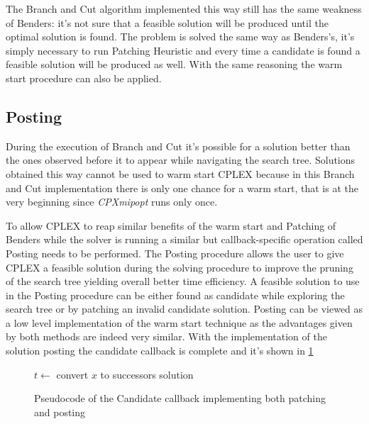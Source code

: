 The Branch and Cut algorithm implemented this way still has the same weakness of Benders: it's not sure that a feasible solution will be produced until the optimal solution is found.
The problem is solved the same way as Benders's, it's simply necessary to run Patching Heuristic and every time a candidate is found a feasible solution will be produced as well.
With the same reasoning the warm start procedure can also be applied.

\subsection{Posting}
During the execution of Branch and Cut it's possible for a solution better than the ones observed before it to appear while navigating the search tree.
Solutions obtained this way cannot be used to warm start CPLEX because in this Branch and Cut implementation there is only one chance for a warm start, that is at the very beginning since \textit{CPXmipopt} runs only once.

To allow CPLEX to reap similar benefits of the warm start and Patching of Benders while the solver is running a similar but callback-specific operation called Posting needs to be performed.
The Posting procedure allows the user to give CPLEX a feasible solution during the solving procedure to improve the pruning of the search tree yielding overall better time efficiency.
A feasible solution to use in the Posting procedure can be either found as candidate while exploring the search tree or by patching an invalid candidate solution.
Posting can be viewed as a low level implementation of the warm start technique as the advantages given by both methods are indeed very similar.
With the implementation of the solution posting the candidate callback is complete and it's shown in \figurename{ \ref{fig:callbackComplete}}

\begin{figure}[htbp]
	\begin{algorithm}[H]
		\vspace{2mm}
		$t \gets$ convert $x$ to successors solution\\
	\end{algorithm}
	\caption{Pseudocode of the Candidate callback implementing both patching and posting} \label{fig:callbackComplete}
\end{figure}

